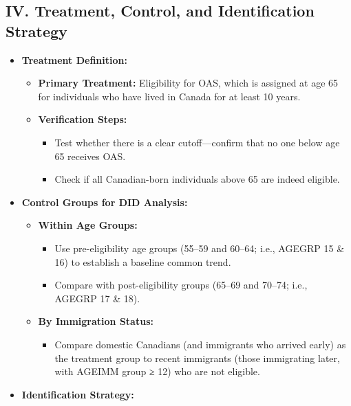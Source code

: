 \documentclass[
]{article}
\providecommand{\tightlist}{%
  \setlength{\itemsep}{0pt}\setlength{\parskip}{0pt}}
\begin{document}
\subsection{IV. Treatment, Control, and Identification
Strategy}\label{iv.-treatment-control-and-identification-strategy}

\begin{itemize}
\tightlist
\item
  \textbf{Treatment Definition:}

  \begin{itemize}
  \tightlist
  \item
    \textbf{Primary Treatment:} Eligibility for OAS, which is assigned
    at age 65 for individuals who have lived in Canada for at least 10
    years.
  \item
    \textbf{Verification Steps:}

    \begin{itemize}
    \tightlist
    \item
      Test whether there is a clear cutoff---confirm that no one below
      age 65 receives OAS.
    \item
      Check if all Canadian-born individuals above 65 are indeed
      eligible.
    \end{itemize}
  \end{itemize}
\item
  \textbf{Control Groups for DID Analysis:}

  \begin{itemize}
  \tightlist
  \item
    \textbf{Within Age Groups:}

    \begin{itemize}
    \tightlist
    \item
      Use pre-eligibility age groups (55--59 and 60--64; i.e., AGEGRP 15
      \& 16) to establish a baseline common trend.
    \item
      Compare with post-eligibility groups (65--69 and 70--74; i.e.,
      AGEGRP 17 \& 18).
    \end{itemize}
  \item
    \textbf{By Immigration Status:}

    \begin{itemize}
    \tightlist
    \item
      Compare domestic Canadians (and immigrants who arrived early) as
      the treatment group to recent immigrants (those immigrating later,
      with AGEIMM group ≥ 12) who are not eligible.
    \end{itemize}
  \end{itemize}
\item
  \textbf{Identification Strategy:}


\end{itemize}
\end{document}
